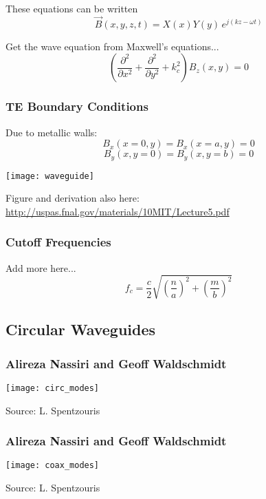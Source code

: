 \documentclass[professionalfonts,t]{beamer}
\begin{document}
{\begin{frame}
	These equations can be written
	\begin{equation}
		\vec{B}\left(x,y,z,t\right) =X\left(x\right)Y\left(y\right)\,e^{j\left(kz-\omega t\right)}
	\end{equation}
	
	Get the wave equation from Maxwell's equations...
	\begin{equation}
		\left(\frac{\partial^2}{\partial x^2} + \frac{\partial^2}{\partial y^2} + k^2_c\right)
		B_z\left(x,y\right)=0
	\end{equation}
\end{frame}


\begin{frame}
\frametitle{TE Boundary Conditions}
\vspace{-0.5em}
	Due to metallic walls:
		\begin{equation}
			B_x\left(x=0,y\right) = B_x\left(x=a,y\right)= 0
		\end{equation}
		\begin{equation}
			B_y\left(x,y=0\right) = B_y\left(x,y=b\right)=0
		\end{equation}
		
	\vspace{-0.3em}
\begin{center}
\texttt{[image: waveguide]}
\end{center}

\vspace{-1.5em}

Figure and derivation also here:	
\small\url{http://uspas.fnal.gov/materials/10MIT/Lecture5.pdf}
\end{frame}

\begin{frame}
	\frametitle{Cutoff Frequencies}
	Add more here...
	\begin{equation}
		f_c = \frac{c}{2}\sqrt{\left(\frac{n}{a}\right)^2+\left(\frac{m}{b}\right)^2}
	\end{equation}
\end{frame}


\subsection{Circular Waveguides}
\begin{frame}
\frametitle{Alireza Nassiri and Geoff Waldschmidt}
\centering
	\texttt{[image: circ\_modes]}
	\vspace{-1em}
	
	\hfill Source: L. Spentzouris
\end{frame}
\begin{frame}
\frametitle{Alireza Nassiri and Geoff Waldschmidt}
\centering
	\texttt{[image: coax\_modes]}
	\vspace{-1em}
	
	\hfill Source: L. Spentzouris
\end{frame}

}
\end{document}
